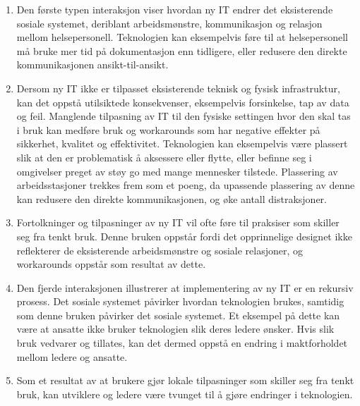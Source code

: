 \begin{enumerate}
\item Den første typen interaksjon viser hvordan ny IT endrer det eksisterende sosiale systemet, deriblant arbeidsmønstre, kommunikasjon og relasjon mellom helsepersonell. Teknologien kan eksempelvis føre til at helsepersonell må bruke mer tid på dokumentasjon enn tidligere, eller redusere den direkte kommunikasjonen ansikt-til-ansikt.
\item Dersom ny IT ikke er tilpasset eksisterende teknisk og fysisk infrastruktur, kan det oppstå utilsiktede konsekvenser, eksempelvis forsinkelse, tap av data og feil. Manglende tilpasning av IT til den fysiske settingen hvor den skal tas i bruk kan medføre bruk og workarounds som har negative effekter på sikkerhet, kvalitet og effektivitet. Teknologien kan eksempelvis være plassert slik at den er problematisk å aksessere eller flytte, eller befinne seg i omgivelser preget av støy go med mange mennesker tilstede. Plassering av arbeidsstasjoner trekkes frem som et poeng, da upassende plassering av denne kan redusere den direkte kommunikasjonen, og øke antall distraksjoner. 
\item Fortolkninger og tilpasninger av ny IT vil ofte føre til praksiser som skiller seg fra tenkt bruk. Denne bruken oppstår fordi det opprinnelige designet ikke reflekterer de eksisterende arbeidsmønstre og sosiale relasjoner, og workarounds oppstår som resultat av dette.
\item Den fjerde interaksjonen illustrerer at implementering av ny IT er en rekursiv prosess. Det sosiale systemet påvirker hvordan teknologien brukes, samtidig som denne bruken påvirker det sosiale systemet. Et eksempel på dette kan være at ansatte ikke bruker teknologien slik deres ledere ønsker. Hvis slik bruk vedvarer og tillates, kan det dermed oppstå en endring i maktforholdet mellom ledere og ansatte.  
\item Som et resultat av at brukere gjør lokale tilpasninger som skiller seg fra tenkt bruk, kan utviklere og ledere være tvunget til å gjøre endringer i teknologien.
\end{enumerate}



